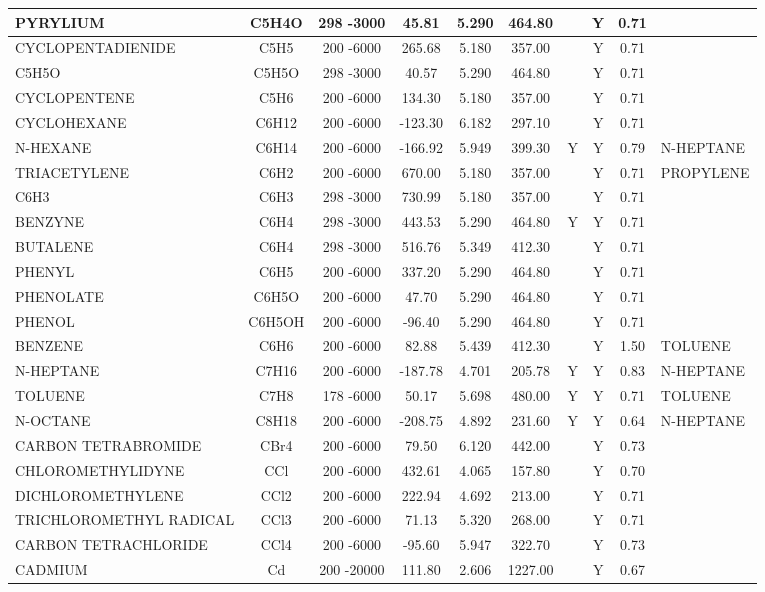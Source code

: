 \begin{longtable}{@{\extracolsep{\fill}}|l|c|c|c|c|c|c|c|c|l|}
PYRYLIUM&C5H4O&298 -3000&   45.81& 5.290&   464.80& &Y& 0.71&\\ \hline
CYCLOPENTADIENIDE&C5H5&200 -6000&  265.68& 5.180&   357.00& &Y& 0.71&\\ \hline
C5H5O&C5H5O&298 -3000&   40.57& 5.290&   464.80& &Y& 0.71&\\ \hline
CYCLOPENTENE&C5H6&200 -6000&  134.30& 5.180&   357.00& &Y& 0.71&\\ \hline
CYCLOHEXANE&C6H12&200 -6000& -123.30& 6.182&   297.10& &Y& 0.71&\\ \hline
N-HEXANE&C6H14&200 -6000& -166.92& 5.949&   399.30&Y&Y& 0.79&N-HEPTANE\\ \hline
TRIACETYLENE&C6H2&200 -6000&  670.00& 5.180&   357.00& &Y& 0.71&PROPYLENE\\ \hline
C6H3&C6H3&298 -3000&  730.99& 5.180&   357.00& &Y& 0.71&\\ \hline
BENZYNE&C6H4&298 -3000&  443.53& 5.290&   464.80&Y&Y& 0.71&\\ \hline
BUTALENE&C6H4&298 -3000&  516.76& 5.349&   412.30& &Y& 0.71&\\ \hline
PHENYL&C6H5&200 -6000&  337.20& 5.290&   464.80& &Y& 0.71&\\ \hline
PHENOLATE&C6H5O&200 -6000&   47.70& 5.290&   464.80& &Y& 0.71&\\ \hline
PHENOL&C6H5OH&200 -6000&  -96.40& 5.290&   464.80& &Y& 0.71&\\ \hline
BENZENE&C6H6&200 -6000&   82.88& 5.439&   412.30& &Y& 1.50&TOLUENE\\ \hline
N-HEPTANE&C7H16&200 -6000& -187.78& 4.701&   205.78&Y&Y& 0.83&N-HEPTANE\\ \hline
TOLUENE&C7H8&178 -6000&   50.17& 5.698&   480.00&Y&Y& 0.71&TOLUENE\\ \hline
N-OCTANE&C8H18&200 -6000& -208.75& 4.892&   231.60&Y&Y& 0.64&N-HEPTANE\\ \hline
CARBON TETRABROMIDE&CBr4&200 -6000&   79.50& 6.120&   442.00& &Y& 0.73&\\ \hline
CHLOROMETHYLIDYNE&CCl&200 -6000&  432.61& 4.065&   157.80& &Y& 0.70&\\ \hline
DICHLOROMETHYLENE&CCl2&200 -6000&  222.94& 4.692&   213.00& &Y& 0.71&\\ \hline
TRICHLOROMETHYL RADICAL&CCl3&200 -6000&   71.13& 5.320&   268.00& &Y& 0.71&\\ \hline
CARBON TETRACHLORIDE&CCl4&200 -6000&  -95.60& 5.947&   322.70& &Y& 0.73&\\ \hline
CADMIUM&Cd&200 -20000&  111.80& 2.606&  1227.00& &Y& 0.67&\\ \hline

\end{longtable}
